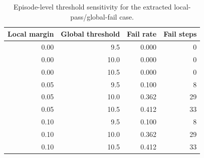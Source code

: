 \begin{table}[t]
    \centering
    \caption{Episode-level threshold sensitivity for the extracted local-pass/global-fail case.}
    \label{tab:threshold-sensitivity}
    \begin{tabular}{rrrr}
        \toprule
        Local margin & Global threshold & Fail rate & Fail steps \\
        \midrule
        0.00 & 9.5 & 0.000 & 0 \\
        0.00 & 10.0 & 0.000 & 0 \\
        0.00 & 10.5 & 0.000 & 0 \\
        0.05 & 9.5 & 0.100 & 8 \\
        0.05 & 10.0 & 0.362 & 29 \\
        0.05 & 10.5 & 0.412 & 33 \\
        0.10 & 9.5 & 0.100 & 8 \\
        0.10 & 10.0 & 0.362 & 29 \\
        0.10 & 10.5 & 0.412 & 33 \\
        \bottomrule
    \end{tabular}
\end{table}
